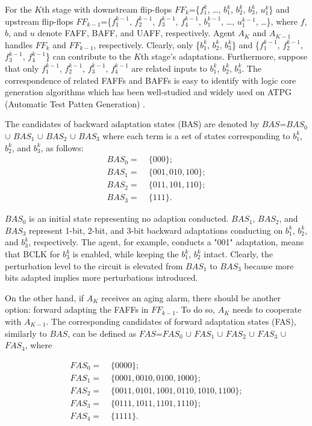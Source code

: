 \exmp\label{rrtaexample}  For the $K$th stage with downstream flip-flops $FF_k$=\{$f_1^k$, \ldots, $b_1^k$, $b_2^k$, $b_3^k$, $u_1^k$\} and upstream flip-flops $FF_{k-1}$=\{$f_1^{k-1}$, $f_2^{k-1}$, $f_3^{k-1}$, $f_4^{k-1}$, $b_1^{k-1}$, \ldots, $u_1^{k-1}$, \ldots\}, where $f$, $b$, and $u$ denote FAFF, BAFF, and UAFF, respectively. Agent $A_K$ and  $A_{K-1}$ handles $FF_k$ and $FF_{k-1}$, respectively. Clearly, only \{$b_1^k$, $b_2^k$, $b_3^k$\} and \{$f_1^{k-1}$, $f_2^{k-1}$, $f_3^{k-1}$, $f_4^{k-1}$\} can contribute to the $K$th stage's adaptations. Furthermore, suppose that only $f_1^{k-1}$, $f_2^{k-1}$, $f_3^{k-1}$, $f_4^{k-1}$ are related inputs to $b_1^k$, $b_2^k$, $b_3^k$. The correspondence of related FAFFs and BAFFs is easy to identify with logic core generation algorithms which has been well-studied and widely used on ATPG (Automatic Test Patten Generation) \cite{POIROT_00}.

The candidates of backward adaptation states (BAS) are denoted by $BAS$=$BAS_0$ $\cup$ $BAS_1$ $\cup$ $BAS_2$ $\cup$ $BAS_3$ where each term is a set of states corresponding to $b_1^k$, $b_2^k$, and $b_3^k$, as follows: 
{\small\begin{align}
BAS_0=\;&\{000\};            \nonumber \\
BAS_1=\;&\{001, 010, 100\};    \nonumber\\
BAS_2=\;&\{011, 101, 110\};  \nonumber \\
BAS_3=\;&\{111\}          . \nonumber
\end{align}}

$BAS_0$ is an initial state representing no adaption conducted. $BAS_1$, $BAS_2$, and $BAS_3$ represent 1-bit, 2-bit, and 3-bit backward adaptations conducting on $b_1^k$, $b_2^k$, and $b_3^k$, respectively. The agent, for example, conducts a "001" adaptation, means that BCLK for $b_3^k$ is enabled, while keeping the $b_1^k$, $b_2^k$ intact. Clearly, the perturbation level to the circuit is elevated from $BAS_1$ to $BAS_3$ because more bits adapted implies more perturbations introduced.

On the other hand, if $A_K$ receives an aging alarm, there should be another option: forward adapting the FAFFs in $FF_{k-1}$. To do so, $A_K$ needs to cooperate with $A_{K-1}$. The corresponding candidates of forward adaptation states (FAS), similarly to $BAS$, can be defined as $FAS$=$FAS_0$ $\cup$ $FAS_1$ $\cup$ $FAS_2$ $\cup$ $FAS_3$ $\cup$ $FAS_4$, where

{\small\begin{align}
FAS_0=\;&\{0000\}; \nonumber \\
FAS_1=\;&\{0001, 0010, 0100, 1000\}; \nonumber \\
FAS_2=\;&\{0011, 0101, 1001, 0110, 1010, 1100\}; \nonumber \\
FAS_3=\;&\{0111, 1011, 1101, 1110 \}; \nonumber \\
FAS_4=\;&\{1111\}. \nonumber
\end{align}}

